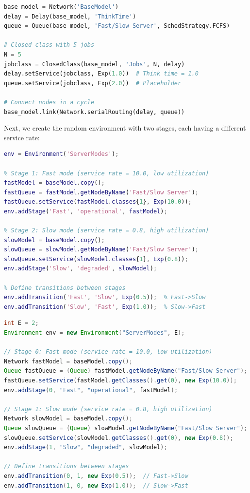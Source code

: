\begin{PYTHON}
\begin{lstlisting}[language = python]
base_model = Network('BaseModel')
delay = Delay(base_model, 'ThinkTime')
queue = Queue(base_model, 'Fast/Slow Server', SchedStrategy.FCFS)

# Closed class with 5 jobs
N = 5
jobclass = ClosedClass(base_model, 'Jobs', N, delay)
delay.setService(jobclass, Exp(1.0))  # Think time = 1.0
queue.setService(jobclass, Exp(2.0))  # Placeholder

# Connect nodes in a cycle
base_model.link(Network.serialRouting(delay, queue))
\end{lstlisting}
\end{PYTHON}

Next, we create the random environment with two stages, each having a different service rate:
\begin{MATLAB}
\begin{lstlisting}[language = matlab]
env = Environment('ServerModes');

% Stage 1: Fast mode (service rate = 10.0, low utilization)
fastModel = baseModel.copy();
fastQueue = fastModel.getNodeByName('Fast/Slow Server');
fastQueue.setService(fastModel.classes{1}, Exp(10.0));
env.addStage('Fast', 'operational', fastModel);

% Stage 2: Slow mode (service rate = 0.8, high utilization)
slowModel = baseModel.copy();
slowQueue = slowModel.getNodeByName('Fast/Slow Server');
slowQueue.setService(slowModel.classes{1}, Exp(0.8));
env.addStage('Slow', 'degraded', slowModel);

% Define transitions between stages
env.addTransition('Fast', 'Slow', Exp(0.5));  % Fast->Slow
env.addTransition('Slow', 'Fast', Exp(1.0));  % Slow->Fast
\end{lstlisting}
\end{MATLAB}
\begin{JAVA}
\begin{lstlisting}[language = java, basicstyle=\ttfamily\scriptsize]
int E = 2;
Environment env = new Environment("ServerModes", E);

// Stage 0: Fast mode (service rate = 10.0, low utilization)
Network fastModel = baseModel.copy();
Queue fastQueue = (Queue) fastModel.getNodeByName("Fast/Slow Server");
fastQueue.setService(fastModel.getClasses().get(0), new Exp(10.0));
env.addStage(0, "Fast", "operational", fastModel);

// Stage 1: Slow mode (service rate = 0.8, high utilization)
Network slowModel = baseModel.copy();
Queue slowQueue = (Queue) slowModel.getNodeByName("Fast/Slow Server");
slowQueue.setService(slowModel.getClasses().get(0), new Exp(0.8));
env.addStage(1, "Slow", "degraded", slowModel);

// Define transitions between stages
env.addTransition(0, 1, new Exp(0.5));  // Fast->Slow
env.addTransition(1, 0, new Exp(1.0));  // Slow->Fast
\end{lstlisting}
\end{JAVA}
